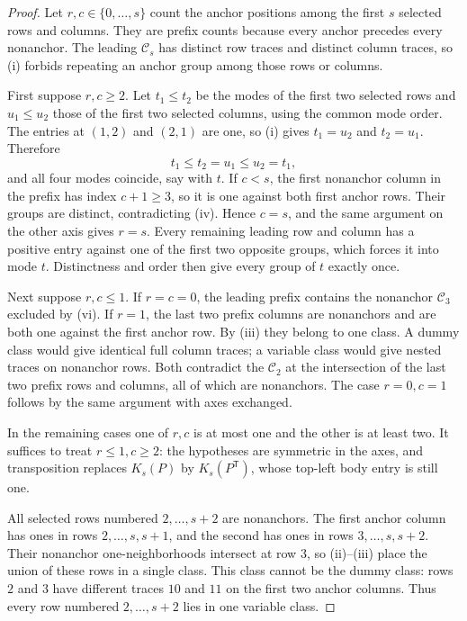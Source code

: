 \documentclass[11pt]{article}
\theoremstyle{definition}
\newcommand{\crown}{\mathcal C}
\begin{document}
\begin{proof}
Let \(r,c\in\{0,\ldots,s\}\) count the anchor positions among the
first \(s\) selected rows and columns. They are prefix counts because
every anchor precedes every nonanchor. The leading \(\crown_s\) has
distinct row traces and distinct column traces, so (i) forbids repeating
an anchor group among those rows or columns.

First suppose \(r,c\ge2\). Let \(t_1\le t_2\) be the modes of
the first two selected rows and \(u_1\le u_2\) those of the first
two selected columns, using the common mode order. The entries at
\((1,2)\) and \((2,1)\) are one, so (i) gives
\(t_1=u_2\) and \(t_2=u_1\). Therefore
\[
 t_1\le t_2=u_1\le u_2=t_1,
\]
and all four modes coincide, say with \(t\). If \(c<s\), the first
nonanchor column in the prefix has index \(c+1\ge3\), so it is one
against both first anchor rows. Their groups are distinct, contradicting
(iv). Hence \(c=s\), and the same argument on the other axis gives
\(r=s\). Every remaining leading row and column has a positive entry
against one of the first two opposite groups, which forces it into mode
\(t\). Distinctness and order then give every group of \(t\) exactly once.

Next suppose \(r,c\le1\). If \(r=c=0\), the leading prefix contains
the nonanchor \(\crown_3\) excluded by (vi). If \(r=1\), the last
two prefix columns are nonanchors and are both one against the first
anchor row. By (iii) they belong to one class. A dummy class would give
identical full column traces; a variable class would give nested traces
on nonanchor rows. Both contradict the \(\crown_2\) at the intersection
of the last two prefix rows and columns, all of which are nonanchors.
The case \(r=0,c=1\) follows by the same argument with axes exchanged.

In the remaining cases one of \(r,c\) is at most one and the other
is at least two. It suffices to treat \(r\le1,c\ge2\): the hypotheses
are symmetric in the axes, and transposition replaces \(K_s(P)\) by
\(K_s(P^{\mathsf T})\), whose top-left body entry is still one.

All selected rows numbered \(2,\ldots,s+2\) are nonanchors.
The first anchor column has ones in rows \(2,\ldots,s,s+1\), and
the second has ones in rows \(3,\ldots,s,s+2\). Their nonanchor
one-neighborhoods intersect at row \(3\), so (ii)--(iii) place the
union of these rows in a single class. This class cannot be the dummy
class: rows \(2\) and \(3\) have different traces \(10\) and \(11\)
on the first two anchor columns. Thus every row numbered
\(2,\ldots,s+2\) lies in one variable class.


\end{proof}
\end{document}
